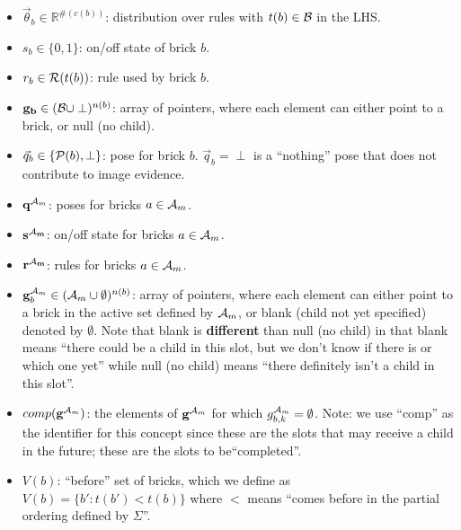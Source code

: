 \documentclass[11pt]{article}
\newcommand{\Pose}{{\cal P}}
\newcommand{\A}{{\cal A}}
\newcommand{\symb}{\Sigma}
\newcommand{\B}{\cal B}
\newcommand{\Am}{\A_{m}}
\newcommand{\gcomp}{comp(\mathbf{g}^{\Am})}
\begin{document}
\begin{itemize}
\item $\vec{\theta}_b \in \mathbb{R}^{\#(c(b))}$: distribution over rules with  $t(b) \in \B$ in the LHS.


\item $s_b \in \{0,1\}$: on/off state of brick $b$.

\item $r_b \in {\cal R}(t(b))$: rule used by brick $b$.

\item $\mathbf{g_b} \in ( {\B} \cup \perp )^{n(b)}$: array of pointers, where each element can either point to a brick, or null (no child).

\item $\vec{q}_b \in \{\Pose(b), \perp\}$: pose for brick $b$. $\vec{q}_b = \perp$ is a ``nothing'' pose that does not contribute to image evidence.

\item $\mathbf{q}^{\Am}$: poses for bricks $a \in \Am$.

\item $\mathbf{s^{\Am}}$: on/off state for bricks $a \in \Am$.

\item $\mathbf{r^{\Am}}$: rules for bricks $a \in \Am$.

\item $\mathbf{g}_b^{\Am} \in ( {\Am} \cup \emptyset )^{n(b)}$: array of pointers, where each element can either point to a brick in the active set defined by $\Am$, or blank (child not yet specified) denoted by $\emptyset$. Note that blank is \textbf{different} than null (no child) in that blank means ``there could be a child in this slot, but we don't know if there is or which one yet'' while null (no child) means ``there definitely isn't a child in this slot''.

\item $\gcomp$: the elements of $\mathbf{g}^{\Am}$ for which $g_{b,k}^{\Am} = \emptyset$. Note: we use ``comp'' as the identifier for this concept since these are the slots that may receive a child in the future; these are the slots to be``completed''.

\item $V(b)$: ``before'' set of bricks, which we define as $V(b) = \{b' : t(b') < t(b) \}$ where $<$ means ``comes before in the partial ordering defined by $\symb$''.


\end{itemize}
\end{document}
